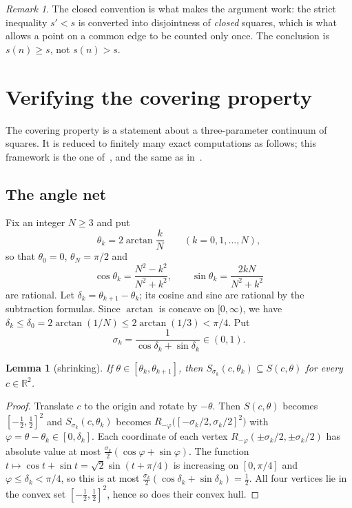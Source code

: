 \documentclass[11pt]{amsart}
\newtheorem{lemma}[theorem]{Lemma}
\theoremstyle{definition}
\theoremstyle{remark}
\newtheorem{remark}[theorem]{Remark}
\newcommand{\R}{\mathbb{R}}
\begin{document}
\begin{remark}
The closed convention is what makes the argument work: the strict inequality $s'<s$ is converted into disjointness of \emph{closed} squares, which is what allows a point on a common edge to be counted only once. The conclusion is $s(n)\ge s$, not $s(n)>s$.
\end{remark}

\section{Verifying the covering property}\label{sec:verify}

The covering property is a statement about a three-parameter continuum of squares. It is reduced to finitely many exact computations as follows; this framework is the one of~\cite{Mas26a,Dan26}, and the same as in~\cite{Ryu26}.

\subsection{The angle net}
Fix an integer $N\ge3$ and put
\[
  \theta_k = 2\arctan\frac{k}{N}\qquad(k=0,1,\dots,N),
\]
so that $\theta_0=0$, $\theta_N=\pi/2$ and
\[
  \cos\theta_k=\frac{N^2-k^2}{N^2+k^2},\qquad \sin\theta_k=\frac{2kN}{N^2+k^2}
\]
are rational. Let $\delta_k=\theta_{k+1}-\theta_k$; its cosine and sine are rational by the subtraction formulas. Since $\arctan$ is concave on $[0,\infty)$, we have $\delta_k\le\delta_0=2\arctan(1/N)\le2\arctan(1/3)<\pi/4$. Put
\[
  \sigma_k=\frac{1}{\cos\delta_k+\sin\delta_k}\in(0,1).
\]

\begin{lemma}[shrinking]\label{lem:shrink}
If $\theta\in[\theta_k,\theta_{k+1}]$, then $S_{\sigma_k}(c,\theta_k)\subseteq S(c,\theta)$ for every $c\in\R^2$.
\end{lemma}

\begin{proof}
Translate $c$ to the origin and rotate by $-\theta$. Then $S(c,\theta)$ becomes $[-\tfrac12,\tfrac12]^2$ and $S_{\sigma_k}(c,\theta_k)$ becomes $R_{-\varphi}\bigl([-\sigma_k/2,\sigma_k/2]^2\bigr)$ with $\varphi=\theta-\theta_k\in[0,\delta_k]$. Each coordinate of each vertex $R_{-\varphi}(\pm\sigma_k/2,\pm\sigma_k/2)$ has absolute value at most $\tfrac{\sigma_k}{2}(\cos\varphi+\sin\varphi)$. The function $t\mapsto\cos t+\sin t=\sqrt2\sin(t+\pi/4)$ is increasing on $[0,\pi/4]$ and $\varphi\le\delta_k<\pi/4$, so this is at most $\tfrac{\sigma_k}{2}(\cos\delta_k+\sin\delta_k)=\tfrac12$. All four vertices lie in the convex set $[-\tfrac12,\tfrac12]^2$, hence so does their convex hull.
\end{proof}
\end{document}
